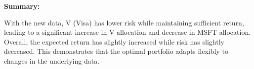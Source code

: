 \documentclass[11pt]{article}
\begin{document}
\begin{enumerate}[leftmargin=*, itemsep=1.5em]
\textbf{Summary:}

With the new data, V (Visa) has lower risk while maintaining sufficient return, leading to a significant increase in V allocation and decrease in MSFT allocation. Overall, the expected return has slightly increased while risk has slightly decreased. This demonstrates that the optimal portfolio adapts flexibly to changes in the underlying data.

\end{enumerate}
\end{document}
